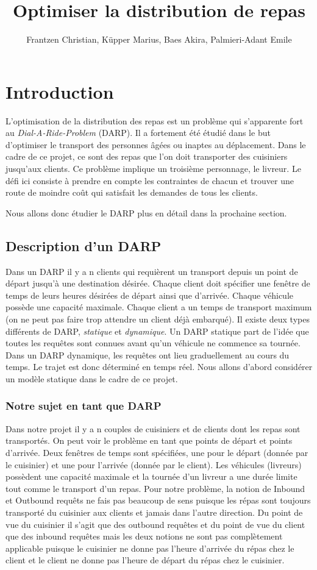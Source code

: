 \documentclass[10pt,a4paper]{report}
\author{Frantzen Christian, Küpper Marius, Baes Akira, Palmieri-Adant Emile}
\title{Optimiser la distribution de repas}
\begin{document}
\maketitle
\chapter*{Introduction}
L'optimisation de la distribution des repas est un problème qui s'apparente fort au \textit{Dial-A-Ride-Problem} (DARP). Il a fortement été étudié dans le but d'optimiser le transport des personnes âgées ou inaptes au déplacement. Dans le cadre de ce projet, ce sont des repas que l'on doit transporter des cuisiniers jusqu'aux clients. Ce problème implique un troisième personnage, le livreur. Le défi ici consiste à prendre en compte les contraintes de chacun et trouver une route de moindre coût qui satisfait les demandes de tous les clients.
    
Nous allons donc étudier le DARP plus en détail dans la prochaine section.
\section*{Description d'un DARP}
Dans un DARP il y a n clients qui requièrent un transport depuis un point de départ jusqu'à une destination désirée. Chaque client doit spécifier une fenêtre de temps de leurs heures désirées de départ ainsi que d'arrivée. Chaque véhicule possède une capacité maximale. Chaque client a un temps de transport maximum (on ne peut pas faire trop attendre un client déjà embarqué).\newline
 Il existe deux types différents de DARP, \textit{statique} et \textit{dynamique}. Un DARP statique part de l'idée que toutes les requêtes sont connues avant qu'un véhicule ne commence sa tournée. Dans un DARP dynamique, les requêtes ont lieu graduellement au cours du temps. Le trajet est donc déterminé en temps réel. 
    Nous allons d'abord considérer un modèle statique dans le cadre de ce projet.
\subsection*{Notre sujet en tant que DARP}
Dans notre projet il y a n couples de cuisiniers et de clients dont les repas sont transportés. On peut voir le problème en tant que points de départ et points d'arrivée. Deux fenêtres de temps sont spécifiées, une pour le départ (donnée par le cuisinier) et une pour l'arrivée (donnée par le client). Les véhicules (livreurs) possèdent une capacité maximale et la tournée d’un livreur a une durée limite tout comme le transport d’un repas. Pour notre problème, la notion de Inbound et Outbound requêts ne fais pas beaucoup de sens puisque les répas sont toujours transporté du cuisinier aux clients et jamais dans l'autre direction. Du point de vue du cuisinier il s'agit que des outbound requêtes et du point de vue du client que des inbound requêtes mais les deux notions ne sont pas complètement applicable puisque le cuisinier ne donne pas l'heure d'arrivée du répas chez le client et le client ne donne pas l'heure de départ du répas chez le cuisinier.
\end{document}
